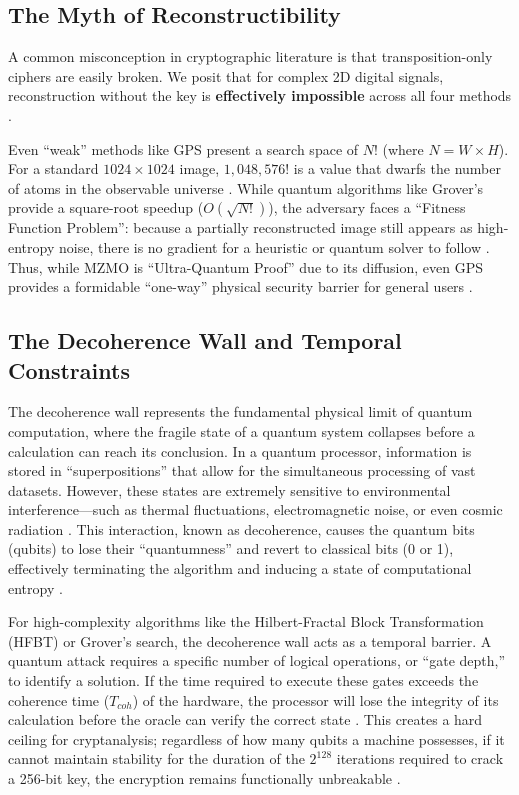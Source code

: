 \documentclass[12pt,fleqn]{article}
\begin{document}
\subsection{The Myth of Reconstructibility}

A common misconception in cryptographic literature is that transposition-only ciphers are easily broken. We posit that for complex 2D digital signals, reconstruction without the key is \textbf{effectively impossible} across all four methods \cite{li2008security}. 

Even ``weak'' methods like GPS present a search space of $N!$ (where $N = W \times H$). For a standard $1024 \times 1024$ image, $1,048,576!$ is a value that dwarfs the number of atoms in the observable universe \cite{biggs2003discrete}. While quantum algorithms like Grover's provide a square-root speedup ($O(\sqrt{N!})$), the adversary faces a ``Fitness Function Problem'': because a partially reconstructed image still appears as high-entropy noise, there is no gradient for a heuristic or quantum solver to follow \cite{grover1996fast, montanaro2016quantum}. Thus, while MZMO is ``Ultra-Quantum Proof'' due to its diffusion, even GPS provides a formidable ``one-way'' physical security barrier for general users \cite{shannon1949communication, bernstein2017post}.

\subsection{The Decoherence Wall and Temporal Constraints}

The decoherence wall represents the fundamental physical limit of quantum computation, where the fragile state of a quantum system collapses before a calculation can reach its conclusion. In a quantum processor, information is stored in ``superpositions'' that allow for the simultaneous processing of vast datasets. However, these states are extremely sensitive to environmental interference---such as thermal fluctuations, electromagnetic noise, or even cosmic radiation \cite{schlosshauer2007decoherence}. This interaction, known as decoherence, causes the quantum bits (qubits) to lose their ``quantumness'' and revert to classical bits (0 or 1), effectively terminating the algorithm and inducing a state of computational entropy \cite{zurek2003decoherence}.

For high-complexity algorithms like the Hilbert-Fractal Block Transformation (HFBT) or Grover's search, the decoherence wall acts as a temporal barrier. A quantum attack requires a specific number of logical operations, or ``gate depth,'' to identify a solution. If the time required to execute these gates exceeds the coherence time ($T_{coh}$) of the hardware, the processor will lose the integrity of its calculation before the oracle can verify the correct state \cite{preskill2018quantum}. This creates a hard ceiling for cryptanalysis; regardless of how many qubits a machine possesses, if it cannot maintain stability for the duration of the $2^{128}$ iterations required to crack a 256-bit key, the encryption remains functionally unbreakable \cite{bernstein2017post}.
\end{document}
